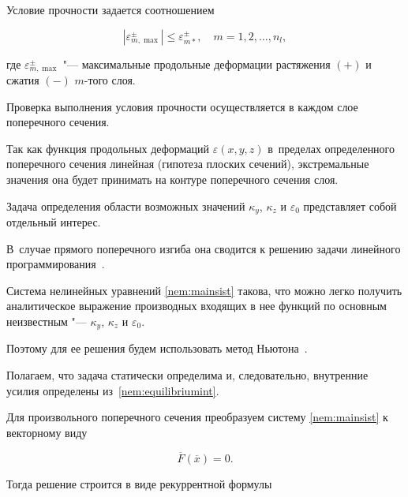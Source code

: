 Условие прочности задается соотношением 

\begin{equation}\label{nem:stren}

|\varepsilon_{m,\max}^\pm |\le\varepsilon_{m*}^{\pm},\quad m=1, 2, \dots,n_l,

\end{equation}

где $\varepsilon_{m,\max}^\pm$ "---  максимальные продольные деформации растяжения $(+)$ и сжатия $(-)$ $m$-того слоя. 

Проверка выполнения условия прочности осуществляется в каждом слое поперечного сечения. 

Так как функция продольных деформаций $\varepsilon(x,y,z)$ в~пределах определенного поперечного сечения линейная (гипотеза плоских сечений), экстремальные значения она будет принимать на контуре поперечного сечения слоя. 

Задача определения области возможных значений $\kappa_y$, $\kappa_z$ и $\varepsilon_0$ представляет собой отдельный интерес. 

В~случае прямого поперечного изгиба она сводится к решению задачи линейного программирования~\cite{BeamNem}.



\smallskip




Система нелинейных уравнений \eqref{nem:mainsist} такова, что можно легко получить аналитическое выражение производных входящих в нее функций по основным неизвестным "---  $\kappa_y$, $\kappa_z$ и $\varepsilon_0$. 

Поэтому для ее решения будем использовать метод Ньютона~\cite{Ortega}. 

Полагаем, что задача статически определима и, следовательно, внутренние усилия определены из~\eqref{nem:equilibriumint}.



Для произвольного поперечного сечения преобразуем систему \eqref{nem:mainsist} к векторному виду



\begin{equation}\label{nem:mainvec}

\overline{F}(\overline{x})=0.

\end{equation}

Тогда решение строится в виде рекуррентной формулы

